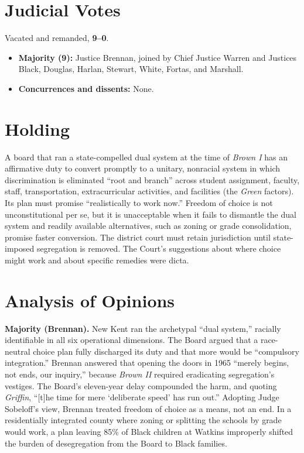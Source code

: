 \documentclass[12pt]{article}
\begin{document}
\section{Judicial Votes}

Vacated and remanded, \textbf{9--0}.
\begin{itemize}
\item \textbf{Majority (9):} Justice Brennan, joined by Chief Justice Warren and Justices Black, Douglas, Harlan, Stewart, White, Fortas, and Marshall.
\item \textbf{Concurrences and dissents:} None.
\end{itemize}

\section{Holding}

A board that ran a state-compelled dual system at the time of \textit{Brown I} has an affirmative duty to convert promptly to a unitary, nonracial system in which discrimination is eliminated ``root and branch'' across student assignment, faculty, staff, transportation, extracurricular activities, and facilities (the \textit{Green} factors). Its plan must promise ``realistically to work now.'' Freedom of choice is not unconstitutional per se, but it is unacceptable when it fails to dismantle the dual system and readily available alternatives, such as zoning or grade consolidation, promise faster conversion. The district court must retain jurisdiction until state-imposed segregation is removed. The Court's suggestions about where choice might work and about specific remedies were dicta.

\section{Analysis of Opinions}

\textbf{Majority (Brennan).} New Kent ran the archetypal ``dual system,'' racially identifiable in all six operational dimensions. The Board argued that a race-neutral choice plan fully discharged its duty and that more would be ``compulsory integration.'' Brennan answered that opening the doors in 1965 ``merely begins, not ends, our inquiry,'' because \textit{Brown II} required eradicating segregation's vestiges. The Board's eleven-year delay compounded the harm, and quoting \textit{Griffin}, ``[t]he time for mere `deliberate speed' has run out.'' Adopting Judge Sobeloff's view, Brennan treated freedom of choice as a means, not an end. In a residentially integrated county where zoning or splitting the schools by grade would work, a plan leaving 85\% of Black children at Watkins improperly shifted the burden of desegregation from the Board to Black families.
\end{document}
